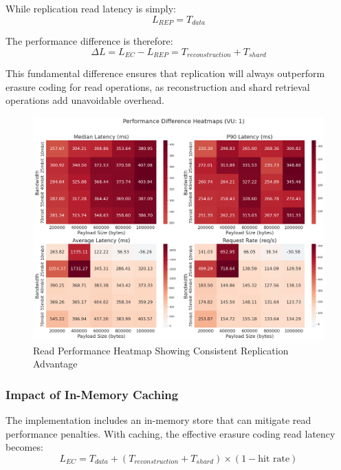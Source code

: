 While replication read latency is simply:
\begin{equation}
L_{REP} = T_{data}
\label{eq:rep-read-latency}
\end{equation}

The performance difference is therefore:
\begin{equation}
\Delta L = L_{EC} - L_{REP} = T_{reconstruction} + T_{shard}
\label{eq:read-latency-diff}
\end{equation}

This fundamental difference ensures that replication will always outperform erasure coding for read operations, as reconstruction and shard retrieval operations add unavoidable overhead.

\begin{figure}[ht]
    \centering
    \includegraphics[width=\columnwidth]{resources/chapter-4/read_bigload_avgnet_heatmap.png}
    \caption{Read Performance Heatmap Showing Consistent Replication Advantage}
    \label{fig:read-heatmap}
\end{figure}

\subsubsection{Impact of In-Memory Caching}

The implementation includes an in-memory store that can mitigate read performance penalties. With caching, the effective erasure coding read latency becomes:
\begin{equation}
L_{EC} = T_{data} + (T_{reconstruction} + T_{shard}) \times (1 - \text{hit rate})
\label{eq:ec-read-latency-cached}
\end{equation}

